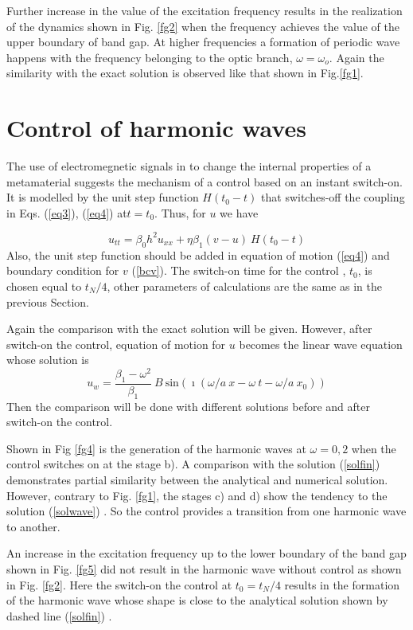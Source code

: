 Further increase in the value of the excitation frequency results in the realization of the dynamics shown in Fig. \ref{fg2} when the frequency achieves the value of the upper boundary of band gap. At higher frequencies a formation of periodic wave happens with the frequency belonging to the optic branch, $\omega=\omega_o$. Again the similarity with the exact solution is observed like that shown in Fig.\ref{fg1}.


  
\section{Control of harmonic waves}

The use of electromegnetic signals  in \cite{Yang,Chen2014,Xiao2015} to change the internal properties of a metamaterial suggests the mechanism of a control based on an instant switch-on. It is modelled by the unit step function $H(t_0-t)$ that switches-off  the coupling in Eqs.  (\ref{eq3}), (\ref{eq4}) at$t=t_0$. Thus, for $u$ we have

\[
u_{tt}=\beta_0 h^2 u_{xx}+\eta \beta_1 (v-u)~H(t_0-t)
\]
Also, the unit step function should be added in equation of motion  (\ref{eq4}) and  boundary condition for $v$ (\ref{bcv}). The switch-on time for the control , $t_0$, is chosen equal to $t_N/4$, other parameters of calculations are the same as in the previous Section.

Again the comparison with the exact solution will be given.  However, after switch-on the control, equation of motion for $u$ becomes the linear wave equation whose solution is 
\begin{equation}\label{solwave}
 u_w=\frac{\beta_1-\omega^2}{\beta_1}~B~{\text{sin}}  (\imath(\omega/a~ x - \omega~ t-\omega/a~ x_0))
 \end{equation}
 Then the comparison will be done with different solutions before and after switch-on the control.
 
 Shown in Fig \ref{fg4} is the generation of the harmonic waves at $\omega=0,2$ when the control switches on at the stage b).  A comparison with the solution (\ref{solfin}) demonstrates partial similarity between the analytical and numerical solution. However, contrary to Fig. \ref{fg1}, the stages c) and d) show the tendency to the solution (\ref{solwave}) . So the control provides a transition from one harmonic wave to another.

An increase in the excitation frequency up to the lower boundary of the band gap shown in Fig. \ref{fg5} did not result in the harmonic wave without control as shown in Fig. \ref{fg2}. Here the switch-on the control at 
$t_0=t_N/4$ results in the formation of the harmonic wave whose shape is close to the analytical solution shown by dashed line  (\ref{solfin}) .

